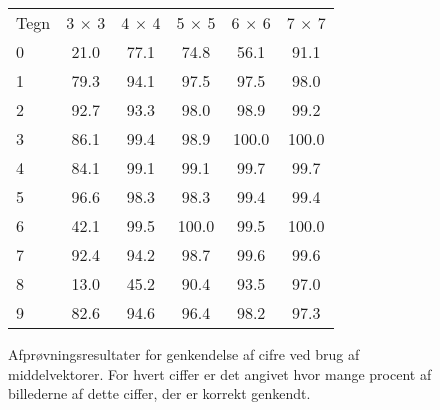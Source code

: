 \begin{figure}[htp]
\centering
\begin{tabular}{|l|c|c|c|c|c|}\hline
\rowcolor[gray]{0.9} \multicolumn{6}{|>{\columncolor[gray]{0.9}}c|}{\textbf{Middelvektor}} \\ \hline
Tegn & 3 $\times$ 3 & 4 $\times$ 4 & 5 $\times$ 5 & 6 $\times$ 6 & 7 $\times$ 7\\\hline
0 & 21.0 & 77.1 & 74.8 & 56.1 & 91.1\\\hline
1 & 79.3 & 94.1 & 97.5 & 97.5 & 98.0\\\hline
2 & 92.7 & 93.3 & 98.0 & 98.9 & 99.2\\\hline
3 & 86.1 & 99.4 & 98.9 & 100.0 & 100.0\\\hline
4 & 84.1 & 99.1 & 99.1 & 99.7 & 99.7\\\hline
5 & 96.6 & 98.3 & 98.3 & 99.4 & 99.4\\\hline
6 & 42.1 & 99.5 & 100.0 & 99.5 & 100.0\\\hline
7 & 92.4 & 94.2 & 98.7 & 99.6 & 99.6\\\hline
8 & 13.0 & 45.2 & 90.4 & 93.5 & 97.0\\\hline
9 & 82.6 & 94.6 & 96.4 & 98.2 & 97.3\\\hline
\end{tabular}
\caption{Afprøvningsresultater for genkendelse af cifre ved brug af middelvektorer. For hvert ciffer er det angivet hvor mange procent af billederne af dette ciffer, der er korrekt genkendt.}
\label{fig:test:middel_tal}
\end{figure}


